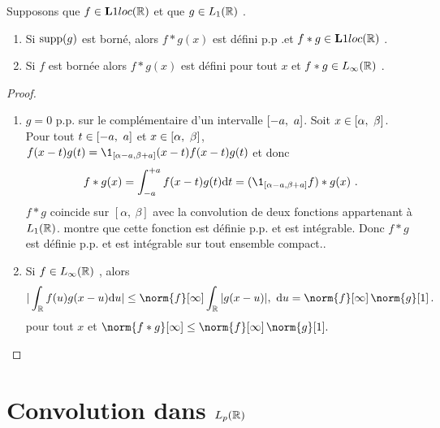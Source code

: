 \begin{proposition}
Supposons que $f\in {\bf L}1loc(\mathbb{R})$ et que $g\in L_1(\mathbb{R})$ .
\begin{enumerate}[label=(\roman*)]
\item Si $\mathrm{supp}(g)$ est born\'e, alors $f*g(x)$ est d\'efini p.p .et $f * g \in {\bf L}1loc(\mathbb{R})$ .
\item Si $f$ est born\'ee alors $f*g(x)$ est d\'efini pour tout $x$ et  $f * g \in L_{\infty}(\mathbb{R})$ .
\end{enumerate}
\end{proposition}
\begin{proof}
\begin{enumerate}[label=(\roman*), wide=0pt, labelindent=\parindent]
\item $g = 0$ p.p. sur le compl\'ementaire d'un intervalle $\left[-a,\ a\right]$. Soit $x \in \left[\alpha,\ \beta\right]$. Pour tout $t\in \left[-a,\ a\right]$ et $x\in \left[\alpha,\ \beta\right]$,
$f(x-t)g(t)=\1_{[\alpha-a,\beta+a]}(x-t)f(x-t)g(t)$  et donc
$$
f*g(x)=\int_{-a}^{+a}f(x-t)g(t)\rmd t=(\1_{[\alpha-a,\beta+a]}f)*g(x)\ .
$$
$f*g$ coincide sur $[\alpha,\ \beta]$ avec la convolution de deux fonctions appartenant \`a $L_1(\mathbb{R})$.  montre que cette fonction est d\'efinie p.p. et est int\'egrable. Donc $f*g$ est d\'efinie p.p. et est int\'egrable sur tout ensemble compact..
\item Si $f\in L_{\infty}(\mathbb{R})$ , alors
$$
|\int_{\rset}f(u)g(x-u)\rmd u|\leq\norm{f}[\infty]\int_{\rset}|g(x-u)|,\ \rmd u=\norm{f}[\infty] \,
\norm{g}[1] \, .
$$
pour tout $x$ et $\norm{f*g}[\infty]\leq \norm{f}[\infty] \, \norm{g}[1].$
\end{enumerate}
\end{proof}
\section{Convolution dans $L_{p}(\mathbb{R})$}



